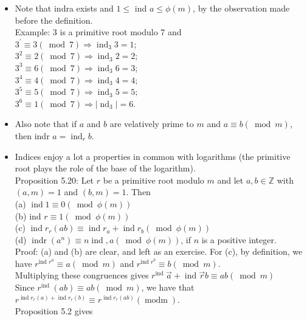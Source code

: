 \documentclass[10pt]{article}
\begin{document}
\begin{itemize}
  \item Note that indra exists and $1 \leq$ ind $a \leq \phi(m)$, by the observation made before the definition.\\
Example: 3 is a primitive root modulo 7 and\\
$3^{\prime} \equiv 3(\bmod 7) \Rightarrow \operatorname{ind}_{3} 3=1 ;$\\
$3^{2} \equiv 2(\bmod 7) \Rightarrow \operatorname{ind}_{3} 2=2 ;$\\
$3^{3} \equiv 6(\bmod 7) \Rightarrow \operatorname{ind}_{3} 6=3$;\\
$3^{4} \equiv 4(\bmod 7) \Rightarrow \operatorname{ind}_{3} 4=4$;\\
$3^{5} \equiv 5(\bmod 7) \Rightarrow \operatorname{ind}_{3} 5=5 ;$\\
$3^{6} \equiv 1(\bmod 7) \Rightarrow\left|\operatorname{nd}_{3}\right|=6$.
  \item Also note that if $a$ and $b$ are velatively prime to $m$ and $a \equiv b(\bmod m)$, then indr $a=\operatorname{ind}_{r} b$.
  \item Indices enjoy a lot a properties in common with logarithms (the primitive root plays the role of the base of the logarithm).\\
Proposition 5.20: Let $r$ be a primitive root modulo $m$ and let $a, b \in \mathbb{Z}$ with $(a, m)=1$ and $(b, m)=1$. Then\\
(a) $\operatorname{ind} 1 \equiv 0(\bmod \phi(m))$\\
(b) ind $r \equiv 1(\bmod \phi(m))$\\
(c) $\operatorname{ind} r_{r}(a b) \equiv \operatorname{ind} r_{a}+\operatorname{ind} r_{b}(\bmod \phi(m))$\\
(d) $\operatorname{indr}\left(a^{n}\right) \equiv n \operatorname{ind}, a(\bmod \phi(m))$, if $n$ is a positive integer.\\
Proof: (a) and (b) are clear, and left as an exercise. For (c), by definition, we have $r^{\text {ind } r^{a}} \equiv a(\bmod m)$ and $r^{\text {ind } r^{b}} \equiv b(\bmod m)$.\\
Multiplying these congruences gives $r^{\text {ind }} \vec{a}+\operatorname{ind} \vec{r} b \equiv a b(\bmod m)$\\
Since $r^{\text {ind }}(a b) \equiv a b(\bmod m)$, we have that $r^{\operatorname{ind} r_{r}(a)+\operatorname{ind} r_{r}(b)} \equiv r^{\operatorname{ind} r_{r}(a b)}(\operatorname{modm})$.\\
Proposition 5.2 gives
\end{itemize}
\end{document}
